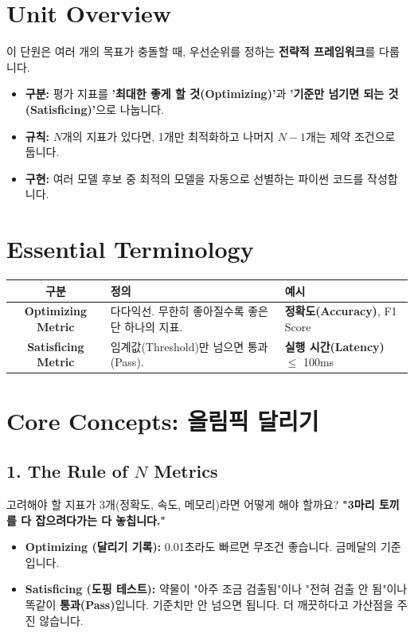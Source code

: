 \documentclass[11pt,a4paper]{book}
\theoremstyle{definition}
\begin{document}
\section{Unit Overview}
\begin{summarybox}[title={핵심 목표}]
이 단원은 여러 개의 목표가 충돌할 때, 우선순위를 정하는 \textbf{전략적 프레임워크}를 다룹니다.
\begin{itemize}
    \item \textbf{구분:} 평가 지표를 \textbf{'최대한 좋게 할 것(Optimizing)'}과 \textbf{'기준만 넘기면 되는 것(Satisficing)'}으로 나눕니다.
    \item \textbf{규칙:} $N$개의 지표가 있다면, 1개만 최적화하고 나머지 $N-1$개는 제약 조건으로 둡니다.
    \item \textbf{구현:} 여러 모델 후보 중 최적의 모델을 자동으로 선별하는 파이썬 코드를 작성합니다.
\end{itemize}
\end{summarybox}

\section{Essential Terminology}
\begin{center}
\begin{tabular}{|c|l|l|}
\hline
\textbf{구분} & \textbf{정의} & \textbf{예시} \\ \hline
\textbf{Optimizing Metric} & 다다익선. 무한히 좋아질수록 좋은 단 하나의 지표. & \textbf{정확도(Accuracy)}, F1 Score \\ \hline
\textbf{Satisficing Metric} & 임계값(Threshold)만 넘으면 통과(Pass). & \textbf{실행 시간(Latency)} $\le$ 100ms \\ \hline
\end{tabular}
\end{center}

\section{Core Concepts: 올림픽 달리기}

\subsection{1. The Rule of $N$ Metrics}
고려해야 할 지표가 3개(정확도, 속도, 메모리)라면 어떻게 해야 할까요?
\textbf{"3마리 토끼를 다 잡으려다가는 다 놓칩니다."}

\begin{analogybox}[title={올림픽 달리기와 도핑 테스트}]
\begin{itemize}
    \item \textbf{Optimizing (달리기 기록):} 0.01초라도 빠르면 무조건 좋습니다. 금메달의 기준입니다.
    \item \textbf{Satisficing (도핑 테스트):} 약물이 "아주 조금 검출됨"이나 "전혀 검출 안 됨"이나 똑같이 \textbf{통과(Pass)}입니다. 기준치만 안 넘으면 됩니다. 더 깨끗하다고 가산점을 주진 않습니다.
\end{itemize}
\end{analogybox}
\end{document}
